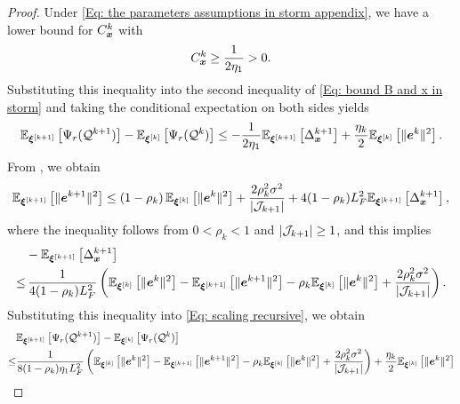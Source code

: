 \begin{proof}
    Under \eqref{Eq: the parameters assumptions in storm appendix}, we have a lower
    bound for $C_{\bm{x}}^{k}$ with
    \begin{align}
        \label{Eq: the bound coefficient of x}C_{\bm{x}}^{k}\geq \frac{1}{2\eta_{1}}>0 .
    \end{align}
    Substituting this inequality into the second inequality of \eqref{Eq: bound B and x in storm}
    and taking the conditional expectation on both sides yields
    \begin{align}
        \label{Eq: scaling recursive}\mathbb{E}_{\bm{\xi}^{[k+1]}}\left[\Psi_r(\mathcal{Q}^{k+1})\right] - \mathbb{E}_{\bm{\xi}^{[k]}}\left[\Psi_r(\mathcal{Q}^{k})\right] \leq - \frac{1}{2\eta_{1}}\mathbb{E}_{\bm{\xi}^{[k+1]}}\left[ \Delta_{\bm{x}}^{k+1}\right] + \frac{\eta_{k}}{2}\mathbb{E}_{\bm{\xi}^{[k]}}\left[ \|\bm{e}^{k}\|^{2}\right].
    \end{align}
    From , we obtain
    \begin{align}
        \mathbb{E}_{\bm{\xi}^{[k+1]}}\left[\| \bm{e}^{k+1}\|^{2}\right] \leq \left(1 - \rho_{k}\right)\mathbb{E}_{\bm{\xi}^{[k]}}\left[\| \bm{e}^{k}\|^{2}\right] + \frac{2 \rho_{k}^{2}\sigma^{2}}{|\mathcal{J}_{k+1}|}+ 4(1-\rho_{k})L_{F}^{2} \mathbb{E}_{\bm{\xi}^{[k+1]}}\left[ \Delta_{\bm{x}}^{k+1} \right], \nonumber
    \end{align}
    where the inequality follows from $0 < \rho_{k}<1$ and  $| \mathcal{J}_{k+1}|
    \geq 1$, and this implies
    \begin{align}
        &- \mathbb{E}_{\bm{\xi}^{[k+1]}}\left[ \Delta_{\bm{x}}^{k+1} \right] \notag \\
        \leq&\, \frac{1}{4(1-\rho_{k})L_{F}^{2}}\left(\mathbb{E}_{\bm{\xi}^{[k]}}\left[\| \bm{e}^{k}\|^{2}\right] - \mathbb{E}_{\bm{\xi}^{[k+1]}}\left[\| \bm{e}^{k+1}\|^{2}\right] -\rho_k \mathbb{E}_{\bm{\xi}^{[k]}}\left[\| \bm{e}^{k}\|^{2}\right]+ \frac{2 \rho_{k}^{2}\sigma^{2}}{|\mathcal{J}_{k+1}|}\right). \nonumber
    \end{align}
    Substituting this inequality into \eqref{Eq: scaling recursive}, we obtain
    {\small
    \begin{align}
             & \EE_{\bxi^{[k+1]}}\left[\Psi_r(\calQ^{k+1})\right] - \EE_{\bxi^{[k]}}\left[\Psi_r(\calQ^{k})\right] \notag     \\
             \leq & \frac{1}{8(1-\rho_k)\eta_1L^2_F}\left(\EE_{\bxi^{[k]}}\left[\| \be^{k}\|^{2}\right] - \EE_{\bxi^{[k+1]}}\left[\| \be^{k+1}\|^{2}\right] -\rho_k \EE_{\bxi^{[k]}}\left[\| \be^{k}\|^{2}\right]+ \frac{2 \rho_{k}^{2}\sigma^{2}}{|\mathcal{J}_{k+1}|}\right) + \frac{\eta_{k}}{2}\EE_{\bxi^{[k]}}\left[ \|\be^{k}\|^{2}\right]  \notag \\

\end{align}}
\end{proof}
